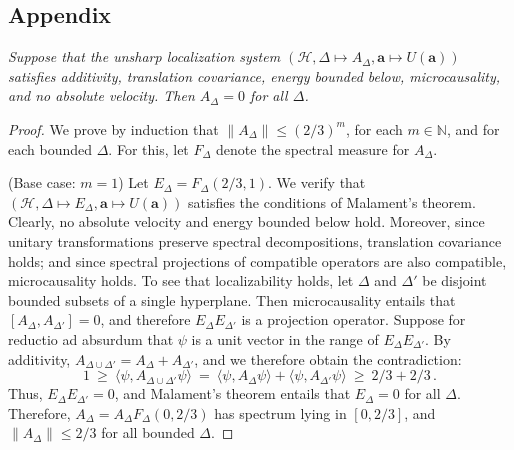 \documentclass[12pt]{article}
\theoremstyle{remark}
\newcommand{\norm}[1]{\mbox{$\| #1\|$}}
\newcommand{\hil}[1]{\mathcal{#1}}
\begin{document}
\begin{appendix}
\section{Appendix}
 {\it Suppose that the unsharp
  localization system $(\hil{H},\Delta \mapsto
  A_{\Delta},\mathbf{a}\mapsto U(\mathbf{a}))$ satisfies additivity,
  translation covariance, energy bounded below, microcausality, and no
  absolute velocity.  Then $A_{\Delta}=0$ for all $\Delta$.  }

\begin{proof} We prove by induction that $\norm{A_{\Delta}}\leq
  (2/3)^{m}$, for each $m\in \mathbb{N}$, and for each bounded
  $\Delta$.  For this, let $F_{\Delta}$ denote the spectral measure
  for $A_{\Delta}$.
  
  (Base case: $m=1$) Let $E_{\Delta}=F_{\Delta }(2/3,1)$.  We verify
  that $(\hil{H},\Delta \mapsto E_{\Delta},\mathbf{a}\mapsto
  U(\mathbf{a}))$ satisfies the conditions of Malament's theorem.
  Clearly, no absolute velocity and energy bounded below hold.
  Moreover, since unitary transformations preserve spectral
  decompositions, translation covariance holds; and since spectral
  projections of compatible operators are also compatible,
  microcausality holds.  To see that localizability holds, let
  $\Delta$ and $\Delta '$ be disjoint bounded subsets of a single
  hyperplane.  Then microcausality entails that $[A_{\Delta},A_{\Delta
    '}]=0$, and therefore $E_{\Delta}E_{\Delta '}$ is a projection
  operator.  Suppose for reductio ad absurdum that $\psi$ is a unit
  vector in the range of $E_{\Delta}E_{\Delta '}$.  By additivity,
  $A_{\Delta \cup \Delta '}=A_{\Delta}+A_{\Delta '}$, and we therefore
  obtain the contradiction:
\begin{equation}
1 \:\geq \:\langle \psi,A_{\Delta \cup \Delta '}\psi \rangle
\: = \: \langle \psi ,A_{\Delta}\psi \rangle +\langle \psi ,A_{\Delta
  '}\psi \rangle \:\geq \: 2/3+2/3 \,.\end{equation}
Thus, $E_{\Delta}E_{\Delta '}=0$, and Malament's theorem entails
that $E_{\Delta }=0$ for all $\Delta$.  Therefore,
  $A_{\Delta}=A_{\Delta}F_{\Delta }(0,2/3)$ has spectrum lying in
  $[0,2/3]$, and $\norm{A_{\Delta}}\leq 2/3$ for all bounded $\Delta$.
  

\end{proof}
\end{appendix}
\end{document}
